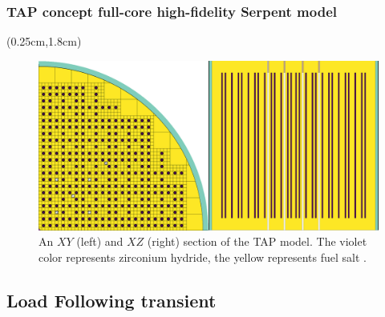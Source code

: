 \begin{frame}
\frametitle{\gls{TAP} concept full-core high-fidelity Serpent model}
\begin{textblock*}{12.25cm}(0.25cm,1.8cm) %
	\begin{figure}[htp!] %
		\includegraphics[width=\textwidth]{./images/tap_model.png}
		\caption{An $XY$ (left) and $XZ$ (right) section of the \gls{TAP} 
		model. The violet color represents zirconium hydride, the yellow 
		represents fuel salt \cite{rykhlevskii_milestone_2019}.}
	\end{figure}
\end{textblock*}
\end{frame}


\subsection{Load Following transient}

